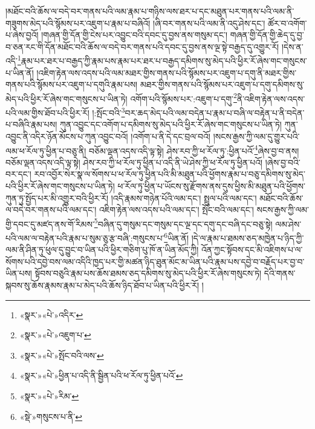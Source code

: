 །མཐོང་བའི་ཆོས་ལ་བདེ་བར་གནས་པའི་ལམ་རྣམ་པ་གཉིས་ལས་ཐར་པ་དང་མཐུན་པར་གནས་པའི་ལམ་ནི་གཟུགས་མེད་པའི་སྙོམས་པར་འཇུག་པ་རྣམ་པ་བཞིའོ། །ཞི་བར་གནས་པའི་ལམ་ནི་འདུ་ཤེས་དང་། ཚོར་བ་འགོག་པ་ཞེས་བྱའོ། །གཞན་གྱི་དོན་གྱི་ངེས་པར་འབྱུང་བའི་དབང་དུ་བྱས་ནས་གསུམ་དང་། གཞན་གྱི་དོན་གྱི་ཆེད་དུ་བྱ་བ་ཅན་རང་གི་དོན་མཐོང་བའི་ཆོས་ལ་བདེ་བར་གནས་པའི་དབང་དུ་བྱས་ནས་ལྔ་སྟེ་བརྒྱད་དུ་འགྱུར་རོ། །དེས་ན་འདི་\footnote{«སྣར་»«པེ་»འདིར་}རྣམ་པར་ཐར་པ་བརྒྱད་ཀྱི་རྣམ་པས་རྣམ་པར་ཐར་པ་བརྒྱད་དམིགས་སུ་མེད་པའི་ཕྱིར་རོ་ཞེས་གང་གསུངས་པ་ཡིན་ནོ། །འཇིག་རྟེན་ལས་འདས་པའི་ལམ་མཐར་གྱིས་གནས་པའི་སྙོམས་པར་འཇུག་པ་དགུ་ནི་མཐར་གྱིས་གནས་པའི་སྙོམས་པར་འཇུག་པ་དགུའི་རྣམ་པས། མཐར་གྱིས་གནས་པའི་སྙོམས་པར་འཇུག་པ་དགུ་དམིགས་སུ་མེད་པའི་ཕྱིར་རོ་ཞེས་གང་གསུངས་པ་ཡིན་ཏེ། འགོག་པའི་སྙོམས་པར་:འཇུག་པ་དགུ་\footnote{«སྣར་»«པེ་»འཇུག་པ་}ནི་འཇིག་རྟེན་ལས་འདས་པའི་ལམ་གྱིས་ཐོབ་པའི་ཕྱིར་རོ། །:སྤོང་བའི་\footnote{«སྣར་»«པེ་»སྤོང་བའི་ལས་}བར་ཆད་མེད་པའི་ལམ་བདེན་པ་རྣམ་པ་བཞི་ལ་བརྟེན་པ་ནི་བདེན་པ་བཞིའི་རྣམ་པས། ཀུན་འབྱུང་དང་འགོག་པ་དམིགས་སུ་མེད་པའི་ཕྱིར་རོ་ཞེས་གང་གསུངས་པ་ཡིན་ཏེ། ཀུན་འབྱུང་ནི་འདིར་ཉོན་མོངས་པ་ཀུན་འབྱུང་བའོ། །འགོག་པ་ནི་དེ་དང་བྲལ་བའོ། །སངས་རྒྱས་ཀྱི་ལམ་དུ་གྱུར་པའི་ལམ་ཕ་རོལ་ཏུ་ཕྱིན་པ་བཅུ་ནི། བཅོམ་ལྡན་འདས་འདི་ལྟ་སྟེ། ཤེས་རབ་ཀྱི་ཕ་རོལ་ཏུ་:ཕྱིན་པའོ་\footnote{«སྣར་»«པེ་»ཕྱིན་པ་འདི་ནི་སྦྱིན་པའི་ཕ་རོལ་ཏུ་ཕྱིན་པའོ་}ཞེས་བྱ་བ་ནས། བཅོམ་ལྡན་འདས་འདི་ལྟ་སྟེ། ཤེས་རབ་ཀྱི་ཕ་རོལ་ཏུ་ཕྱིན་པ་འདི་ནི་ཡེ་ཤེས་ཀྱི་ཕ་རོལ་ཏུ་ཕྱིན་པའོ། །ཞེས་བྱ་བའི་བར་དང་། རབ་འབྱོར་སེར་སྣ་ལ་སོགས་པ་ཕ་རོལ་ཏུ་ཕྱིན་པའི་མི་མཐུན་པའི་ཕྱོགས་རྣམ་པ་བཅུ་དམིགས་སུ་མེད་པའི་ཕྱིར་རོ་ཞེས་གང་གསུངས་པ་ཡིན་ཏེ། ཕ་རོལ་ཏུ་ཕྱིན་པ་ཡོངས་སུ་རྫོགས་ནས་དུས་ཕྱིས་མི་མཐུན་པའི་ཕྱོགས་ཀུན་ཏུ་སྤྱོད་པར་མི་འགྱུར་བའི་ཕྱིར་རོ། །འདི་རྣམས་གཉེན་པོའི་ལམ་དང་། སྤྲུལ་པའི་ལམ་དང་། མཐོང་བའི་ཆོས་ལ་བདེ་བར་གནས་པའི་ལམ་དང་། འཇིག་རྟེན་ལས་འདས་པའི་ལམ་དང་། སྤོང་བའི་ལམ་དང་། སངས་རྒྱས་ཀྱི་ལམ་གྱི་དབང་དུ་མཛད་ནས་གོ་རིམས་\footnote{«སྣར་»«པེ་»རིམ་}བཞིན་དུ་གསུམ་དང་གསུམ་དང་ལྔ་དང་དགུ་དང་བཞི་དང་བཅུ་སྟེ། ལམ་ཤེས་པའི་ལམ་ལ་བརྟེན་པའི་རྣམ་པ་སུམ་ཅུ་རྩ་བཞི་:གསུངས་པ་\footnote{«སྡེ་»གསུངས་པ་ནི་}ཡིན་ནོ། །དེ་ལ་རྣམ་པ་ཐམས་ཅད་མཁྱེན་པ་ཉིད་ཀྱི་ལམ་ནི་ཤིན་ཏུ་ཕུལ་དུ་བྱུང་བ་ཡིན་པའི་ཕྱིར་གཅིག་པུ་ཁོ་ན་ཡིན་མོད་ཀྱི། འོན་ཀྱང་སྟོབས་དང་མི་འཇིགས་པ་ལ་སོགས་པའི་དབྱེ་བས་ལམ་འདིའི་ཁྱད་པར་གྱི་མཚན་ཉིད་ཐུན་མོང་མ་ཡིན་པའི་རྣམ་པས་དབྱེ་བ་བརྗོད་པར་བྱ་བ་ཡིན་པས། སྟོབས་བཅུའི་རྣམ་པས་ཆོས་ཐམས་ཅད་དམིགས་སུ་མེད་པའི་ཕྱིར་རོ་ཞེས་གསུངས་ཏེ། དེའི་གནས་སྐབས་སུ་ཆོས་རྣམས་རྣམ་པ་མེད་པའི་ཆོས་ཉིད་ཐོབ་པ་ཡིན་པའི་ཕྱིར་རོ། །
